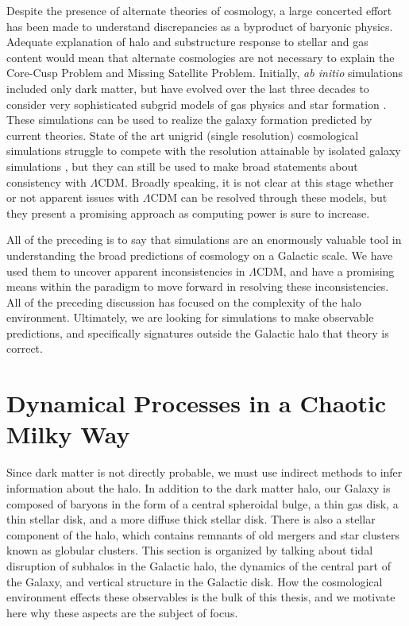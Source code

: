 Despite the presence of alternate theories of cosmology, a large concerted effort has been made to understand discrepancies as a byproduct of baryonic physics.  Adequate explanation of halo and substructure response to stellar and gas content would mean that alternate cosmologies are not necessary to explain the Core-Cusp Problem and Missing Satellite Problem. Initially, \textit{ab initio} simulations included only dark matter, but have evolved over the last three decades to consider very sophisticated subgrid models of gas physics and star formation \citep{LucySPH,CenOstriker92,KatzSPH96,SpringelMultiphase03,Stinson2006}.  These simulations can be used to realize the galaxy formation predicted by current theories. State of the art unigrid (single resolution) cosmological simulations struggle to compete with the resolution attainable by isolated galaxy simulations \citep{Illustris,Eagle}, but they can still be used to make broad statements about consistency with $\Lambda$CDM. Broadly speaking, it is not clear at this stage whether or not apparent issues with $\Lambda$CDM can be resolved through these models, but they present a promising approach as computing power is sure to increase.


All of the preceding is to say that simulations are an enormously valuable tool in understanding the broad predictions of cosmology on a Galactic scale. We have used them to uncover apparent inconsistencies in $\Lambda$CDM, and have a promising means within the paradigm to move forward in resolving these inconsistencies. All of the preceding discussion has focused on the complexity of the halo environment. Ultimately, we are looking for simulations to make observable predictions, and specifically signatures outside the Galactic halo that theory is correct.

\section{Dynamical Processes in a Chaotic Milky Way}

Since dark matter is not directly probable, we must use indirect methods to infer information about the halo. In addition to the dark matter halo, our Galaxy is composed of baryons in the form of a central spheroidal bulge, a thin gas disk, a thin stellar disk, and a more diffuse thick stellar disk. There is also a stellar component of the halo, which contains remnants of old mergers and star clusters known as globular clusters. This section is organized by talking about tidal disruption of subhalos in the Galactic halo, the dynamics of the central part of the Galaxy, and vertical structure in the Galactic disk. How the cosmological environment effects these observables is the bulk of this thesis, and we motivate here why these aspects are the subject of focus.

